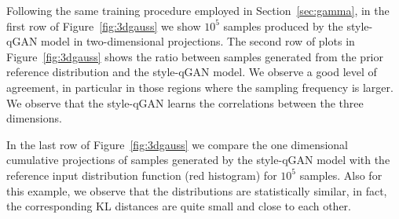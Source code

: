 \documentclass[twocolumn,preprintnumbers,superscriptaddress]{revtex4-2}
\begin{document}
Following the same training procedure employed in Section~\ref{sec:gamma}, in
the first row of Figure~\ref{fig:3dgauss} we show $10^5$ samples produced by the
style-qGAN model in two-dimensional projections.
%
The second row of plots in Figure~\ref{fig:3dgauss} shows the ratio between
samples generated from the prior reference distribution and the style-qGAN model. We
observe a good level of agreement, in particular in those regions where the
sampling frequency is larger. We observe that the style-qGAN learns the correlations
between the three dimensions.

In the last row of Figure~\ref{fig:3dgauss} we compare the one dimensional
cumulative projections of samples generated by the style-qGAN model with the
reference input distribution function (red histogram) for $10^5$ samples. Also
for this example, we observe that the distributions are statistically similar,
in fact, the corresponding KL distances are quite small and close to each other.
\end{document}

